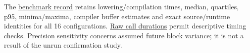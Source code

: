 \documentclass[11pt,a4paper]{article}
\begin{document}
The \href{\detokenize{../empirical_extension_2026-09-08/analysis/results/BENCHMARK.json}}{benchmark record} retains lowering/compilation times, median, quartiles, p95, minima/maxima, compiler buffer estimates and exact source/runtime identities for all 16 configurations. \href{\detokenize{../empirical_extension_2026-09-08/analysis/results/BENCHMARK_TIMES.csv}}{Raw call durations} permit descriptive timing checks. \href{\detokenize{../empirical_extension_2026-09-08/confirmation/PRECISION.json}}{Precision sensitivity} concerns assumed future block variance; it is not a result of the unrun confirmation study.
\end{document}
